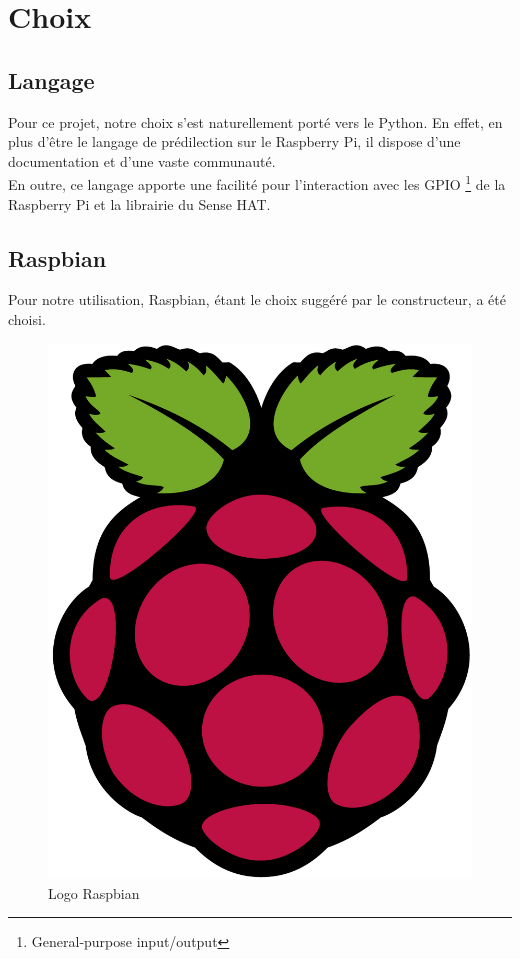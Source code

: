 \section{Choix}
\label{sec:choix}

\subsection{Langage}
\label{sec:langage}

Pour ce projet, notre choix s'est naturellement porté vers le Python.
En effet, en plus d'être le langage de prédilection sur le Raspberry Pi, il dispose d'une
documentation et d'une vaste communauté. \\
En outre, ce langage apporte une facilité pour l'interaction avec les
GPIO \footnote{General-purpose input/output} de la Raspberry Pi et la librairie du
Sense HAT.

\subsection{Raspbian}
\label{sec:raspbian}

Pour notre utilisation, Raspbian, étant le choix suggéré par le constructeur, a été choisi.

\begin{figure}[!h]
  \centering
  \includegraphics[scale=0.06]
  {textures/images/choices/raspbian.pdf}
  \caption{Logo Raspbian}
  \label{fig:raspbian}
\end{figure}

